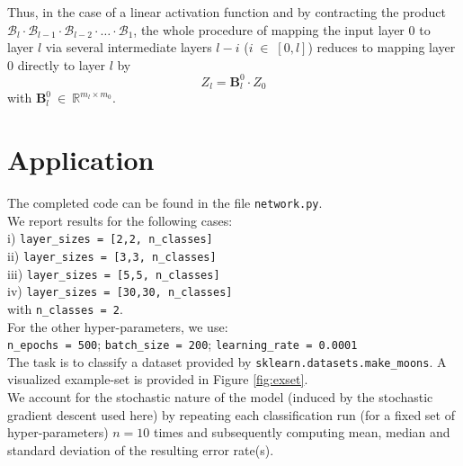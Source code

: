 \documentclass[12pt]{article}
\begin{document}
Thus, in the case of a linear activation function and by contracting the product $\mathcal{B}_l \cdot \mathcal{B}_{l-1} \cdot \mathcal{B}_{l-2} \cdot \dots \cdot \mathcal{B}_1$, the whole procedure of mapping the input layer 0 to layer $l$ via several intermediate layers $l-i$ ($i \; \in \; [0, l]$) reduces to mapping layer 0 directly to layer $l$ by
\begin{equation}
Z_l = \mathbf{B}_l^0 \cdot Z_0
\end{equation}
with $\mathbf{B}_l^0 \: \in \: \mathbb{R}^{m_l \times m_0}$.
\newpage
\enlargethispage{5\baselineskip}
\section{Application}
The completed code can be found in the file \texttt{network.py}. \\ 
\newline
We report results for the following cases: \\
\newline
i) \texttt{layer\_sizes = [2,2, n\_classes]} \\
ii) \texttt{layer\_sizes = [3,3, n\_classes]} \\
iii) \texttt{layer\_sizes = [5,5, n\_classes]} \\
iv) \texttt{layer\_sizes = [30,30, n\_classes]} \\
with \texttt{n\_classes = 2}.\\
\newline
For the other hyper-parameters, we use: \\
\texttt{n\_epochs = 500}; 
\texttt{batch\_size = 200}; 
\texttt{learning\_rate = 0.0001} \\
\newline
The task is to classify a dataset provided by \texttt{sklearn.datasets.make\_moons}. A visualized example-set is provided in Figure \ref{fig:exset}. \\
We account for the stochastic nature of the model (induced by the stochastic gradient descent used here) by repeating each classification run (for a fixed set of hyper-parameters) $n = 10$ times and subsequently computing mean, median and standard deviation of the resulting error rate(s). 
\end{document}
